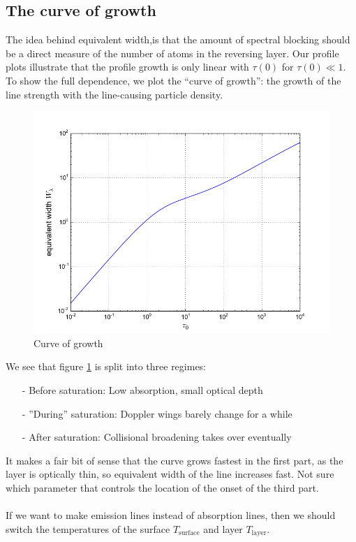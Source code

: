 \documentclass{article}
\begin{document}
\subsection{The curve of growth}
The idea behind equivalent width,is that the amount of spectral blocking should be a direct measure of the number of atoms in the reversing layer. Our profile plots illustrate that the profile growth is only linear with $\tau(0)$ for $\tau(0)\ll1$. To show the full dependence, we plot the ``curve of growth'': the growth of the line strength with the line-causing particle density.

\begin{figure}[H]
  \centering
  \includegraphics[scale=0.5]{ssa_3_5.png}
  \caption{Curve of growth}
  \label{fig:curve}
\end{figure}
We see that figure \ref{fig:curve} is split into three regimes:
\begin{itemize}
  \item[-]Before saturation: Low absorption, small optical depth
  \item[-]''During'' saturation: Doppler wings barely change for a while
  \item[-]After saturation: Collisional broadening takes over eventually
\end{itemize}
It makes a fair bit of sense that the curve grows fastest in the first part, as the layer is optically thin, so equivalent width of the line increases fast. Not sure which parameter that controls the location of the onset of the third part.\\\\
If we want to make emission lines instead of absorption lines, then we should switch the temperatures of the surface $T_{\text{surface}}$ and layer $T_{\text{layer}}$.
\end{document}
